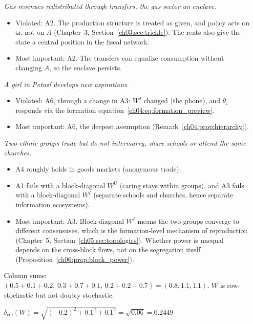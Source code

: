 \documentclass[../solutions_manual.tex]{subfiles}
\begin{document}
 \emph{Gas revenues redistributed through transfers, the gas sector an enclave.}
\begin{itemize}
\item Violated: A2. The production structure is treated as given, and policy acts on $\boldsymbol\omega$, not on $A$ (Chapter~3, Section~\ref{ch03:sec:trickle}). The rents also give the state a central position in the fiscal network.
\item Most important: A2. The transfers can equalize consumption without changing $A$, so the enclave persists.
\end{itemize}

 \emph{A girl in Potos\'i develops new aspirations.}
\begin{itemize}
\item Violated: A6, through a change in A3: $W^I$ changed (the phone), and $\theta_i$ responds via the formation equation~\eqref{ch04:eq:formation_preview}.
\item Most important: A6, the deepest assumption (Remark~\ref{ch04:prop:hierarchy}).
\end{itemize}

 \emph{Two ethnic groups trade but do not intermarry, share schools or attend the same churches.}
\begin{itemize}
\item A4 roughly holds in goods markets (anonymous trade).
\item A1 fails with a block-diagonal $W^U$ (caring stays within groups), and A3 fails with a block-diagonal $W^I$ (separate schools and churches, hence separate information ecosystems).
\item Most important: A3. Block-diagonal $W^I$ means the two groups converge to different consensuses, which is the formation-level mechanism of reproduction (Chapter~5, Section~\ref{ch05:sec:topologies}). Whether power is unequal depends on the cross-block flows, not on the segregation itself (Proposition~\ref{ch06:prop:block_power}).
\end{itemize}


 Column sums: $(0.5 + 0.1 + 0.2,\ 0.3 + 0.7 + 0.1,\ 0.2 + 0.2 + 0.7) = (0.8, 1.1, 1.1)$. $W$ is row-stochastic but not doubly stochastic.

 $\delta_{\text{col}}(W) = \sqrt{(-0.2)^2 + 0.1^2 + 0.1^2} = \sqrt{0.06} = 0.2449$.
\end{document}
